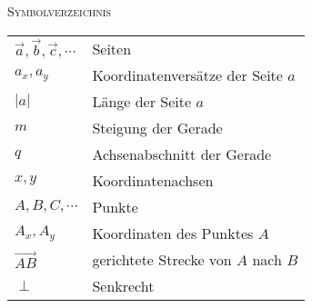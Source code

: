 \documentclass[a4paper]{amsart}
\theoremstyle{definition}
\begin{document}
\begin{large}
    \centerline{\textsc{Symbolverzeichnis}}
\end{large}
\bigskip

\renewcommand*{\arraystretch}{1}

\begin{tabular}{ll}
    $\vec a,\vec b, \vec c, \cdots$               &Seiten\\
    $a_x,a_y$                   &Koordinatenversätze der Seite $a$\\
    $|a|$                       &Länge der Seite $a$\\
    $m$                         &Steigung der Gerade\\
    $q$                         &Achsenabschnitt der Gerade\\
    $x, y$                      &Koordinatenachsen\\
    $A, B, C, \cdots$          &Punkte\\
    $A_x, A_y$                 &Koordinaten des Punktes $A$\\
    $\overrightarrow{AB}$      &gerichtete Strecke von $A$ nach $B$\\
    $\perp$                    &Senkrecht
\end{tabular}
\end{document}
